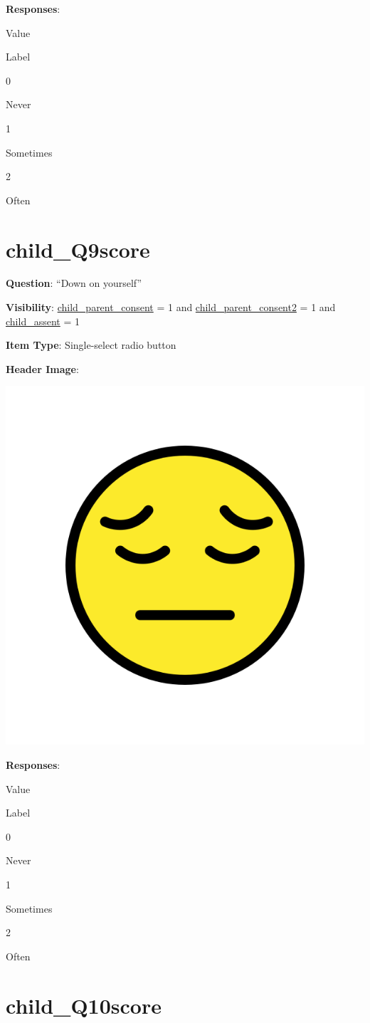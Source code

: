 \documentclass[]{book}
\begin{document}
\textbf{Responses}:

Value

Label

0

Never

1

Sometimes

2

Often

\hypertarget{child_q9score}{%
\section{child\_Q9score}\label{child_q9score}}

\textbf{Question}: ``Down on yourself''

\textbf{Visibility}: \protect\hyperlink{child_parent_consent}{child\_parent\_consent} = 1 and \protect\hyperlink{child_parent_consent2}{child\_parent\_consent2} = 1 and \protect\hyperlink{child_assent}{child\_assent} = 1

\textbf{Item Type}: Single-select radio button

\textbf{Header Image}:

\begin{flushleft}\includegraphics[width=0.33\linewidth]{downloadFigs4latex_HBN_PMHS_Codebook/child_Q9score_headerImg} \end{flushleft}

\textbf{Responses}:

Value

Label

0

Never

1

Sometimes

2

Often

\hypertarget{child_q10score}{%
\section{child\_Q10score}\label{child_q10score}}
\end{document}
